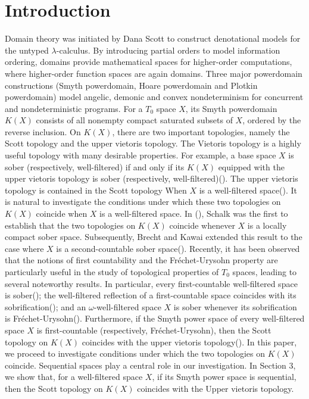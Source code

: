 \documentclass[preprint,12pt]{elsarticle}
\numberwithin{equation}{section}
\begin{document}

\section{Introduction}
\label{}

Domain theory was initiated by Dana Scott to construct denotational models for the untyped \(\lambda\)-calculus. By introducing partial orders to model information ordering, domains provide mathematical spaces for higher-order computations, where higher-order function spaces are again domains. Three major powerdomain constructions (Smyth powerdomain, Hoare powerdomain and Plotkin powerdomain) model angelic, demonic and convex nondeterminism for concurrent and nondeterministic programs. For a $T_{0}$ space $X$, its Smyth powerdomain $K(X)$ consists of all nonempty compact saturated subsets of $X$, ordered by the reverse inclusion. On
$K(X)$, there are two important topologies, namely the Scott topology and the upper vietoris topology. The Vietoris topology is a highly useful topology with many desirable properties. For example, a base space $X$ is sober (respectively, well-filtered) if and only if its
$K(X)$ equipped with the upper vietoris topology is sober (respectively, well-filtered)(\cite{GG03,EEE20}). The upper vietoris topology is contained in the Scott topology When $X$ is a well-filtered space(\cite{GG03}). It is natural to investigate the conditions under which these two topologies on $K(X)$ coincide when $X$ is a well-filtered space. In (\cite{EEE21}), Schalk was the first to establish that the two topologies on $K(X)$  coincide whenever $X$ is a locally compact sober space. Subsequently, Brecht and Kawai extended this result to the case where $X$ is a second-countable sober space(\cite{EEF1}). Recently, it has been observed that the notions of first countability and the Fr\'echet-Urysohn property are particularly useful in the study of topological properties of $T_{0}$ spaces, leading to several noteworthy results. In particular, every first-countable well-filtered space is sober(\cite{EEF22}); the well-filtered reflection of a first-countable space coincides with its sobrification(\cite{EEF25}); and an
$\omega$-well-filtered space $X$ is sober whenever its sobrification is Fr\'echet-Urysohn(\cite{EEF24}). Furthermore, if the Smyth power space of every well-filtered space $X$ is first-countable (respectively, Fr\'echet-Urysohn), then the Scott topology on
$K(X)$ coincides with the upper vietoris topology(\cite{EEF24,EEF30}). In this paper, we proceed to investigate conditions under which the two topologies on $K(X)$ coincide. Sequential spaces play a central role in our investigation. In Section 3, we show that, for a well-filtered space $X$, if its Smyth power space is sequential, then the Scott topology on $K(X)$ coincides with the Upper vietoris topology.
\end{document}

